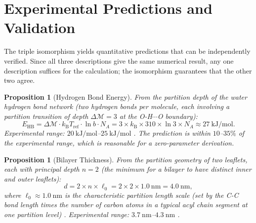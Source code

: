 \documentclass[twocolumn,10pt]{article}
\newtheorem{proposition}[theorem]{Proposition}
\theoremstyle{remark}
\newcommand{\kB}{k_{\mathrm{B}}}
\newcommand{\Depth}{\mathcal{M}}
\begin{document}
\section{Experimental Predictions and Validation}
\label{sec:predictions}

The triple isomorphism yields quantitative predictions that can be independently verified.
Since all three descriptions give the same numerical result, any one description suffices for the calculation; the isomorphism guarantees that the other two agree.

\begin{proposition}[Hydrogen Bond Energy]
\label{prop:hydrogen_bond}
From the partition depth of the water hydrogen bond network (two hydrogen bonds per molecule, each involving a partition transition of depth $\Delta\Depth = 3$ at the O-H$\cdots$O boundary):
\begin{equation}
E_{\mathrm{HB}} = \Delta\Depth \cdot \kB T_{\mathrm{ref}} \cdot \ln b \cdot N_A = 3 \times \kB \times 310 \times \ln 3 \times N_A \approx \SI{27}{\kilo\joule\per\mole}.
\label{eq:hydrogen_bond}
\end{equation}
Experimental range: $\SI{20}{\kilo\joule\per\mole}$--$\SI{25}{\kilo\joule\per\mole}$ \cite{israelachvili2011}.
The prediction is within $10$--$35\%$ of the experimental range, which is reasonable for a zero-parameter derivation.
\end{proposition}

\begin{proposition}[Bilayer Thickness]
\label{prop:bilayer_thickness}
From the partition geometry of two leaflets, each with principal depth $n = 2$ (the minimum for a bilayer to have distinct inner and outer leaflets):
\begin{equation}
d = 2 \times n \times \ell_0 = 2 \times 2 \times \SI{1.0}{\nano\meter} = \SI{4.0}{\nano\meter},
\label{eq:bilayer_thickness}
\end{equation}
where $\ell_0 \approx \SI{1.0}{\nano\meter}$ is the characteristic partition length scale (set by the C-C bond length times the number of carbon atoms in a typical acyl chain segment at one partition level) \cite{gennis1989,helfrich1973}.
Experimental range: $\SI{3.7}{\nano\meter}$--$\SI{4.3}{\nano\meter}$ \cite{gennis1989,lipowsky1995}.
\end{proposition}
\end{document}

